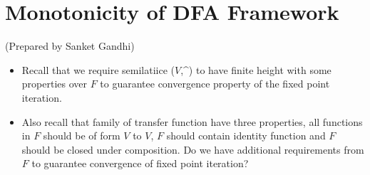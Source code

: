 \section {Monotonicity of DFA Framework}
\setlength{\parindent}{0pt}
(Prepared by Sanket Gandhi)

\vspace{0.3cm}
\begin{itemize}
    \item Recall that we require semilatiice ($V$,\^{}) to have finite height with some properties over $F$ to guarantee convergence property of the fixed point  iteration.
    \item Also recall that family of transfer function have three properties, all functions in $F$ should be of form $V$ to $V$, $F$ should contain identity function and $F$ should be closed under composition. Do we have additional requirements from $F$ to guarantee convergence of fixed point iteration?
\end{itemize}

